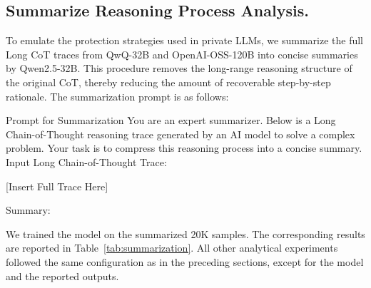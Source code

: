 \subsection{Summarize Reasoning Process Analysis.}
To emulate the protection strategies used in private LLMs, we summarize the full Long CoT traces from QwQ-32B and OpenAI-OSS-120B into concise summaries by Qwen2.5-32B. This procedure removes the long-range reasoning structure of the original CoT, thereby reducing the amount of recoverable step-by-step rationale. The summarization prompt is as follows:

\begin{PromptBox}{Prompt for Summarization}
You are an expert summarizer. Below is a Long Chain-of-Thought reasoning trace generated by an AI model to solve a complex problem. Your task is to compress this reasoning process into a concise summary.\\



Input Long Chain-of-Thought Trace:

[Insert Full Trace Here]

Summary:
\end{PromptBox}
We trained the model on the summarized 20K samples. The corresponding results are reported in Table~\ref{tab:summarization}. All other analytical experiments followed the same configuration as in the preceding sections, except for the model and the reported outputs.
